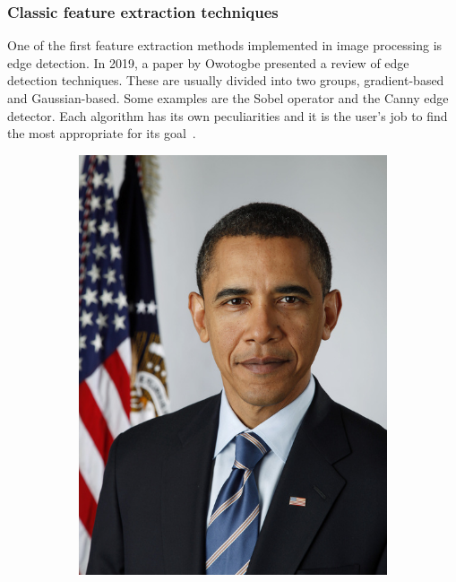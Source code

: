 \documentclass[conference]{IEEEtran}
\begin{document}
				\subsubsection{Classic feature extraction techniques}
					
					One of the first feature extraction methods implemented in image processing is edge detection.				
					In 2019, a paper by Owotogbe presented a review of edge detection techniques. 
					These are usually divided into two groups, gradient-based and Gaussian-based. 
					Some examples are the Sobel operator and the Canny edge detector. 
					Each algorithm has its own peculiarities and it is the user's job to find 
					the most appropriate for its goal~\cite{owotogbe2019edge}.\\
					
					\begin{figure}[!ht]
						\centering
						\begin{subfigure}[!ht]{0.48\linewidth}
							\centerline{\includegraphics[width=0.9\linewidth]{imgs/obama.jpg}}
							\label{fig:1a}
						\end{subfigure}

\end{figure}
\end{document}
